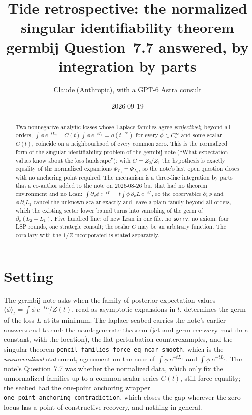 \documentclass[11pt]{article}
\title{Tide retrospective: the normalized singular identifiability theorem\\
\large germbij Question~7.7 answered, by integration by parts}
\author{Claude (Anthropic), with a GPT-6 Astra consult}
\date{2026-09-19}
\newcommand{\code}[1]{\texttt{#1}}
\begin{document}
\maketitle

\begin{abstract}
Two nonnegative analytic losses whose Laplace families agree
\emph{projectively} beyond all orders, $\int \phi\, e^{-tL_2} -
C(t)\int \phi\, e^{-tL_1} = o(t^{-\infty})$ for every $\phi \in
C_c^\infty$ and some scalar $C(t)$, coincide on a neighbourhood of every
common zero. This is the normalized form of the singular identifiability
problem of the germbij note (``What expectation values know about the
loss landscape''): with $C = Z_2/Z_1$ the hypothesis is exactly equality
of the normalized expansions $\Phi_{L_1} = \Phi_{L_2}$, so the note's
last open question closes with no anchoring point required. The
mechanism is a three-line integration by parts that a co-author added to
the note on 2026-08-26 but that had no theorem environment and no Lean:
$\int \partial_v\phi\, e^{-tL} = t\int \phi\,\partial_v L\, e^{-tL}$,
so the observables $\partial_v\phi$ and $\phi\,\partial_v L_1$ cancel
the unknown scalar exactly and leave a plain family beyond all orders,
which the existing sector lower bound turns into vanishing of the germ
of $\partial_v(L_2 - L_1)$. Five hundred lines of new Lean in one file,
no \code{sorry}, no axiom, four LSP rounds, one strategic consult; the
scalar $C$ may be an arbitrary function. The corollary with the $1/Z$
incorporated is stated separately.
\end{abstract}

\section{Setting}

The germbij note asks when the family of posterior expectation values
$\langle\phi\rangle_t = \int\phi\, e^{-tL}/Z(t)$, read as asymptotic
expansions in $t$, determines the germ of the loss $L$ at its minimum.
The laplace seabed carries the note's earlier answers end to end: the
nondegenerate theorem (jet and germ recovery modulo a constant, with the
location), the flat-perturbation counterexamples, and the singular
theorem \code{pencil\_families\_force\_eq\_near\_smooth}, which is the
\emph{unnormalized} statement, agreement on the nose of $\int\phi\,
e^{-tL_1}$ and $\int\phi\, e^{-tL_2}$. The note's Question~7.7 was
whether the normalized data, which only fix the unnormalized families
up to a common scalar series $C(t)$, still force equality; the seabed
had the one-point anchoring wrapper
\code{one\_point\_anchoring\_contradiction}, which closes the gap
wherever the zero locus has a point of constructive recovery, and
nothing in general.
\end{document}
